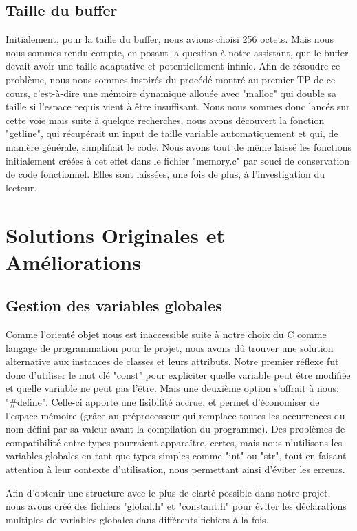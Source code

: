 \documentclass[utf8]{article}
\begin{document}
\subsection{Taille du buffer}
Initialement, pour la taille du buffer, nous avions choisi 256 octets. Mais nous nous sommes rendu compte, en posant la question à notre assistant, 
que le buffer devait avoir une taille adaptative et potentiellement infinie. Afin de résoudre ce problème, nous nous sommes inspirés du procédé montré au premier TP de ce cours, 
c'est-à-dire une mémoire dynamique allouée avec "malloc" qui double sa taille si l'espace requis vient à être insuffisant. Nous nous sommes donc lancés sur
cette voie mais suite à quelque recherches, nous avons découvert la fonction "getline", qui récupérait un input de taille variable automatiquement et qui, de manière
générale, simplifiait le code. Nous avons tout de même laissé les fonctions initialement créées à cet effet dans le fichier "memory.c" par souci de
conservation de code fonctionnel. Elles sont laissées, une fois de plus, à l'investigation du lecteur.


\newpage
\section{Solutions Originales et Améliorations}

\subsection{Gestion des variables globales}
Comme l'orienté objet nous est inaccessible suite à notre choix du C comme langage de programmation pour le projet, nous avons dû trouver une solution
alternative aux instances de classes et leurs attributs. Notre premier réflexe fut donc d'utiliser le mot clé "const" pour expliciter quelle variable peut
être modifiée et quelle variable ne peut pas l'être. Mais une deuxième option s'offrait à nous: "\#define". Celle-ci apporte une 
lisibilité accrue, et permet d'économiser de l'espace mémoire (grâce au préprocesseur qui remplace toutes les occurrences du nom défini par sa valeur avant 
la compilation du programme). Des problèmes de compatibilité entre types pourraient apparaître, certes, mais nous n'utilisons les variables 
globales en tant que types simples comme "int" ou "str", tout en faisant attention à leur contexte d'utilisation, nous permettant ainsi d'éviter les erreurs.

Afin d'obtenir une structure avec le plus de clarté possible dans notre projet, nous avons créé des fichiers "global.h" et "constant.h" pour éviter les déclarations
multiples de variables globales dans différents fichiers à la fois.
\end{document}
